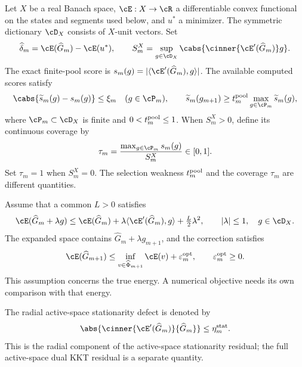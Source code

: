 \documentclass[11pt]{article}
\theoremstyle{remark}
\begin{document}
Let $X$ be a real Banach space, $\cE:X\to\cR$ a differentiable convex
functional on the states and segments used below, and $u^*$ a minimizer.
The symmetric dictionary $\cD_X$ consists of $X$-unit vectors. Set
\[
 \widehat\delta_m=\cE(\widehat G_m)-\cE(u^*),\qquad
 S_m^X=\sup_{g\in\cD_X}\cabs{\cinner{\cE'(\widehat G_m)}g}.
\]
The exact finite-pool score is $s_m(g)=|\langle\cE'(\widehat G_m),g\rangle|$.
The available computed scores satisfy
\begin{equation}
 \cabs{\widetilde s_m(g)-s_m(g)}\leq\xi_m\quad(g\in\cP_m),\qquad
 \widetilde s_m(g_{m+1})\geq t_m^{\rm pool}
                  \max_{g\in\cP_m}\widetilde s_m(g),
 \label{eq:c5-oracle}
\end{equation}
where $\cP_m\subset\cD_X$ is finite and $0<t_m^{\rm pool}\leq1$.
When $S_m^X>0$, define its continuous coverage by
\begin{equation}
 \tau_m=\frac{\max_{g\in\cP_m}s_m(g)}{S_m^X}\in[0,1].
 \label{eq:c5-coverage}
\end{equation}
Set $\tau_m=1$ when $S_m^X=0$. The selection weakness $t_m^{\rm pool}$
and the coverage $\tau_m$ are different quantities.

Assume that a common $L>0$ satisfies
\begin{equation}
 \cE(\widehat G_m+\lambda g)
 \leq\cE(\widehat G_m)+\lambda\langle\cE'(\widehat G_m),g\rangle
            +\tfrac L2\lambda^2,\qquad |\lambda|\leq1,\quad g\in\cD_X.
 \label{eq:c5-directional}
\end{equation}
The expanded space contains $\widehat G_m+\lambda g_{m+1}$, and the
correction satisfies
\begin{equation}
 \cE(\widehat G_{m+1})\leq
 \inf_{v\in\widehat\Phi_{m+1}}\cE(v)+\varepsilon_m^{\rm opt},
 \qquad \varepsilon_m^{\rm opt}\geq0 .
 \label{eq:c5-correction}
\end{equation}
This assumption concerns the true energy. A numerical objective needs its
own comparison with that energy.

The radial active-space stationarity defect is denoted by
\begin{equation}
 \abs{\cinner{\cE'(\widehat G_m)}{\widehat G_m}}
 \leq \eta_m^{\rm stat}.
 \label{eq:c5-orthogonality-defect}
\end{equation}
This is the radial component of the active-space stationarity residual; the
full active-space dual KKT residual is a separate quantity.
\end{document}

